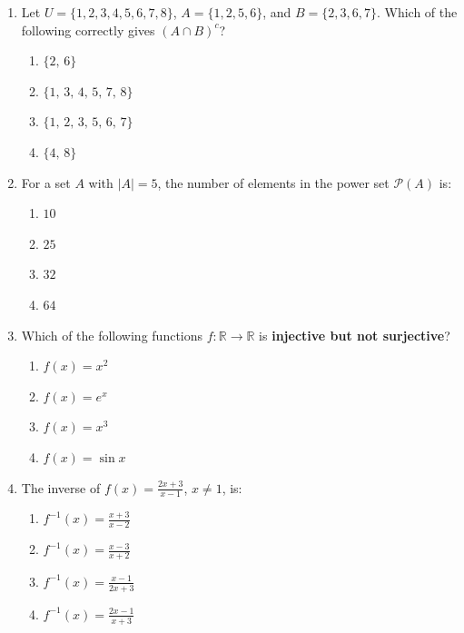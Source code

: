 \documentclass[11pt]{article}
\begin{document}
\begin{enumerate}[label=\textbf{Q\arabic*.},leftmargin=2.5em,itemsep=1.6em]

\item Let $U = \{1,2,3,4,5,6,7,8\}$, $A = \{1,2,5,6\}$, and $B = \{2,3,6,7\}$.
Which of the following correctly gives $(A \cap B)^{c}$?

\medskip
\begin{enumerate}[label=\textbf{(\Alph*)},leftmargin=2em,itemsep=0.4em]
  \item $\{2,\,6\}$
  \item $\{1,\,3,\,4,\,5,\,7,\,8\}$
  \item $\{1,\,2,\,3,\,5,\,6,\,7\}$
  \item $\{4,\,8\}$
\end{enumerate}

\item For a set $A$ with $|A| = 5$, the number of elements in the power set
$\mathcal{P}(A)$ is:

\medskip
\begin{enumerate}[label=\textbf{(\Alph*)},leftmargin=2em,itemsep=0.4em]
  \item $10$
  \item $25$
  \item $32$
  \item $64$
\end{enumerate}

\item Which of the following functions $f : \mathbb{R} \to \mathbb{R}$ is
\textbf{injective but not surjective}?

\medskip
\begin{enumerate}[label=\textbf{(\Alph*)},leftmargin=2em,itemsep=0.4em]
  \item $f(x) = x^{2}$
  \item $f(x) = e^{x}$
  \item $f(x) = x^{3}$
  \item $f(x) = \sin x$
\end{enumerate}

\item The inverse of $\displaystyle f(x) = \frac{2x+3}{x-1}$, \; $x \neq 1$, is:

\medskip
\begin{enumerate}[label=\textbf{(\Alph*)},leftmargin=2em,itemsep=0.4em]
  \item $\displaystyle f^{-1}(x) = \frac{x+3}{x-2}$
  \item $\displaystyle f^{-1}(x) = \frac{x-3}{x+2}$
  \item $\displaystyle f^{-1}(x) = \frac{x-1}{2x+3}$
  \item $\displaystyle f^{-1}(x) = \frac{2x-1}{x+3}$
\end{enumerate}


\end{enumerate}
\end{document}
